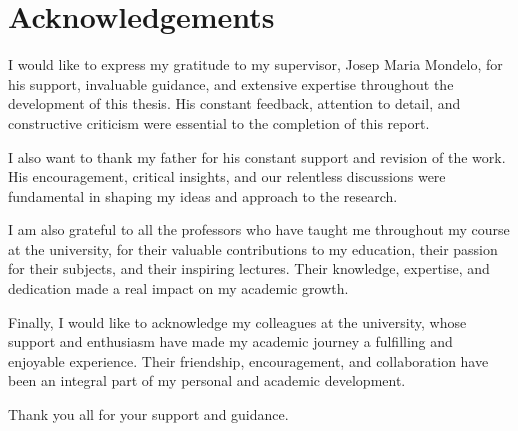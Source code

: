 \documentclass[../main.tex]{subfiles}
\begin{document}
\section*{Acknowledgements}
I would like to express my gratitude to my supervisor, Josep Maria Mondelo, for his support, invaluable guidance, and extensive expertise throughout the development of this thesis. His constant feedback, attention to detail, and constructive criticism were essential to the completion of this report.

I also want to thank my father for his constant support and revision of the work. His encouragement, critical insights, and our relentless discussions were fundamental in shaping my ideas and approach to the research.

I am also grateful to all the professors who have taught me throughout my course at the university, for their valuable contributions to my education, their passion for their subjects, and their inspiring lectures. Their knowledge, expertise, and dedication made a real impact on my academic growth.

Finally, I would like to acknowledge my colleagues at the university, whose support and enthusiasm have made my academic journey a fulfilling and enjoyable experience. Their friendship, encouragement, and collaboration have been an integral part of my personal and academic development.

Thank you all for your support and guidance.
\end{document}
